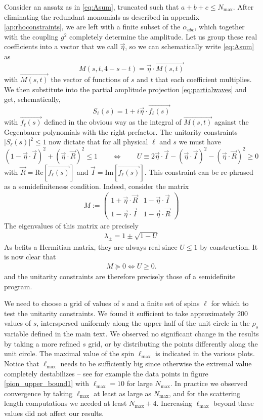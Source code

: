 \documentclass[12pt]{article}
\newcommand{\begBvR}[1]{\begin{#1}}
\newcommand{\beq}{\begBvR{equation}}
\newcommand{\eeq}{\end{equation}}
\newcommand{\bea}{\begBvR{eqnarray}}
\newcommand{\eea}{\end{eqnarray}}
\newcommand{\<}{{\langle}}
\renewcommand{\>}{{\rangle}}
\begin{document}
Consider an ansatz as in \eqref{eq:Asum}, truncated such that $a+b+c \leq N_{\max}$. After eliminating the redundant monomials as described in appendix \ref{ap:rhoconstraints}, we are left with a finite subset of the $\alpha_{abc}$, which together with the coupling $g^2$ completely determine the amplitude. Let us group these real coefficients into a vector that we call $\vec \eta$, so we can schematically write \eqref{eq:Asum} as
\beq
M(s,t,4-s-t) = \vec{\eta} \cdot \overrightarrow{M(s,t)}
\eeq
with $\overrightarrow{M(s,t)}$ the vector of functions of $s$ and $t$ that each coefficient multiplies. We then substitute into the partial amplitude projection \eqref{eq:partialwaves} and get, schematically,
\beq
S_\ell(s) = 1 + i \vec{\eta} \cdot \overrightarrow{f_\ell(s)}
\eeq
with $\overrightarrow{f_\ell(s)}$ defined in the obvious way as the integral of $\overrightarrow{M(s,t)}$ against the Gegenbauer polynomials with the right prefactor. The unitarity constraints $|S_\ell(s)|^2 \leq 1$ now dictate that for all physical $\ell$ and $s$ we must have
\beq
\left(1 - \vec{\eta} \cdot \vec I\right)^2 +( \vec\eta \cdot \vec R)^2 \leq 1 \qquad \Leftrightarrow \qquad U \equiv 2 \vec \eta \cdot \vec I - (\vec \eta \cdot \vec I)^2- (\vec\eta \cdot \vec R)^2 \geq 0
\eeq
with $\vec{R} = \text{Re}[\overrightarrow{f_\ell(s)}]$ and $\vec{I} = \text{Im}[\overrightarrow{f_\ell(s)}]$. This constraint can be re-phrased as a semidefiniteness condition. Indeed, consider the matrix
\bea
M:=\left ( \begin{array}{cc} 1+ \vec \eta \cdot \vec R & 1-\vec{\eta} \cdot{\vec I}\\ 1-\vec{\eta} \cdot{\vec I} & 1-\vec \eta \cdot \vec R \end{array}\right)
\eea
The eigenvalues of this matrix are precisely
\bea
\lambda_{\pm}=1\pm \sqrt{1 - U}
\eea
As befits a Hermitian matrix, they are always real since $U \leq 1$ by construction. It is now clear that
\bea
M\succeq 0 \Leftrightarrow U \geq 0.
\eea
and the unitarity constraints are therefore precisely those of a semidefinite program.

We need to choose a grid of values of $s$ and a finite set of spins $\ell$ for which to test the unitarity constraints. We found it sufficient to take approximately 200 values of $s$, interspersed uniformly along the upper half of the unit circle in the $\rho_s$ variable defined in the main text. We observed no significant change in the results by taking a more refined $s$ grid, or by distributing the points differently along the unit circle. The maximal value of the spin $\ell_{\max}$ is indicated in the various plots. Notice that $\ell_{\max}$ needs to be sufficiently big since otherwise the extremal value completely destabilizes -- see for example the data points in figure \ref{pion_upper_bound1} with $\ell_{\max} = 10$ for large $N_{\max}$. In practice we observed convergence by taking $\ell_{\max}$ at least as large as $N_{\max}$, and for the scattering length computations we needed at least $N_{\max} + 4$. Increasing $\ell_{\max}$ beyond these values did not affect our results.
\end{document}
